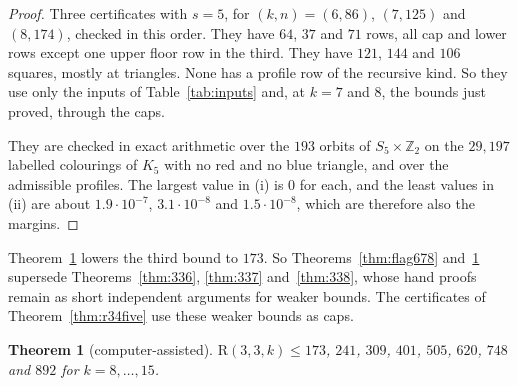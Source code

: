 \documentclass[11pt]{article}
\theoremstyle{spacedplain}
\newtheorem{theorem}{Theorem}[section]
\theoremstyle{spaceddef}
\theoremstyle{spacedremark}
\newcommand{\R}{\mathrm{R}}
\begin{document}
\begin{proof}
Three certificates with $s=5$, for $(k,n)=(6,86)$, $(7,125)$ and $(8,174)$, checked in this order.
They have $64$, $37$ and $71$ rows, all cap and lower rows except one upper floor row in the third.
They have $121$, $144$ and $106$ squares, mostly at triangles.
None has a profile row of the recursive kind.
So they use only the inputs of Table~\ref{tab:inputs} and, at $k=7$ and $8$, the bounds just proved, through the caps.

They are checked in exact arithmetic over the $193$ orbits of $S_5\times\mathbb Z_2$ on the $29{,}197$ labelled colourings of $K_5$ with no red and no blue triangle, and over the admissible profiles.
The largest value in (i) is $0$ for each, and the least values in (ii) are about $1.9\cdot10^{-7}$, $3.1\cdot10^{-8}$ and $1.5\cdot10^{-8}$, which are therefore also the margins.
\end{proof}

Theorem~\ref{thm:flagladder} lowers the third bound to $173$.
So Theorems~\ref{thm:flag678} and~\ref{thm:flagladder} supersede Theorems~\ref{thm:336}, \ref{thm:337} and~\ref{thm:338}, whose hand proofs remain as short independent arguments for weaker bounds.
The certificates of Theorem~\ref{thm:r34five} use these weaker bounds as caps.

\begin{theorem}[computer-assisted]\label{thm:flagladder}
$\R(3,3,k)\le 173$, $241$, $309$, $401$, $505$, $620$, $748$ and $892$ for $k=8,\dots,15$.
\end{theorem}
\end{document}
